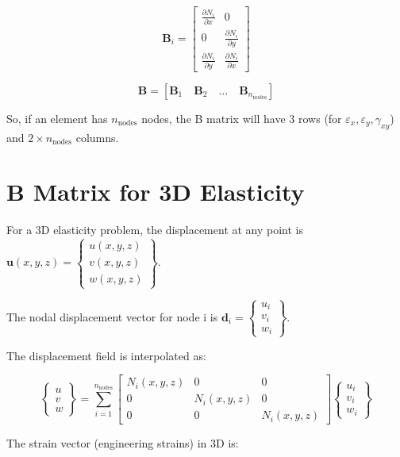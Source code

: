\documentclass[
  11pt,
  a4paper,
]{scrbook}
\begin{document}
\[\mathbf{B}_i = \begin{bmatrix}
\frac{\partial N_i}{\partial x} & 0 \\
0 & \frac{\partial N_i}{\partial y} \\
\frac{\partial N_i}{\partial y} & \frac{\partial N_i}{\partial x}
\end{bmatrix}\]

\[\mathbf{B} = [\mathbf{B}_1 \quad \mathbf{B}_2 \quad \ldots \quad \mathbf{B}_{n_{\text{nodes}}}]\]

So, if an element has \(n_{\text{nodes}}\) nodes, the B matrix will have
3 rows (for \(\varepsilon_x, \varepsilon_y, \gamma_{xy}\)) and
\(2 \times n_{\text{nodes}}\) columns.

\section{B Matrix for 3D Elasticity}\label{b-matrix-for-3d-elasticity}

For a 3D elasticity problem, the displacement at any point is
\(\mathbf{u}(x,y,z) = \begin{Bmatrix} u(x,y,z) \\ v(x,y,z) \\ w(x,y,z) \end{Bmatrix}\).

The nodal displacement vector for node i is
\(\mathbf{d}_i = \begin{Bmatrix} u_i \\ v_i \\ w_i \end{Bmatrix}\).

The displacement field is interpolated as:

\[\begin{Bmatrix} u \\ v \\ w \end{Bmatrix} = \sum_{i=1}^{n_{\text{nodes}}} \begin{bmatrix} N_i(x,y,z) & 0 & 0 \\ 0 & N_i(x,y,z) & 0 \\ 0 & 0 & N_i(x,y,z) \end{bmatrix} \begin{Bmatrix} u_i \\ v_i \\ w_i \end{Bmatrix}\]

The strain vector (engineering strains) in 3D is:
\end{document}
